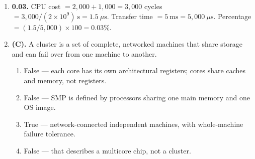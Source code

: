 \documentclass[11pt]{article}
\begin{document}
\begin{enumerate}
\item[\textbf{Q9}] \textbf{0.03.} CPU cost $= 2{,}000 + 1{,}000 = 3{,}000$ cycles $= 3{,}000 / (2 \times 10^{9})\ \text{s} = 1.5\ \mu\text{s}$. Transfer time $= 5\ \text{ms} = 5{,}000\ \mu\text{s}$. Percentage $= (1.5/5{,}000) \times 100 = 0.03\%$.

\item[\textbf{Q10}] \textbf{(C).} A cluster is a set of complete, networked machines that share storage and can fail over from one machine to another.

\begin{enumerate}
  \item[(A)] False --- each core has its own architectural registers; cores share caches and memory, not registers.
  \item[(B)] False --- SMP is defined by processors sharing one main memory and one OS image.
  \item[(C)] True --- network-connected independent machines, with whole-machine failure tolerance.
  \item[(D)] False --- that describes a multicore chip, not a cluster.
\end{enumerate}
\end{enumerate}
\end{document}
